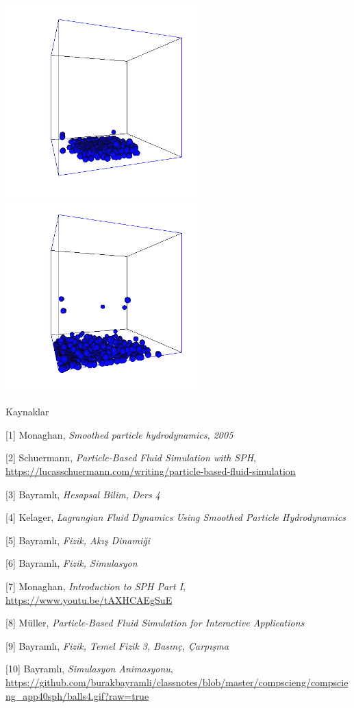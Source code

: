 \documentclass[12pt,fleqn]{article}\usepackage{../../common}
\begin{document}
\includegraphics[width=20em]{glutout-006.png}
\includegraphics[width=20em]{glutout-008.png}


Kaynaklar

[1] Monaghan, {\em Smoothed particle hydrodynamics, 2005}

[2] Schuermann, {\em Particle-Based Fluid Simulation with SPH},
    \url{https://lucasschuermann.com/writing/particle-based-fluid-simulation}

[3] Bayramlı, {\em Hesapsal Bilim, Ders 4}

[4] Kelager, {\em Lagrangian Fluid Dynamics Using Smoothed Particle Hydrodynamics}

[5] Bayramlı, {\em Fizik, Akış Dinamiği}

[6] Bayramlı, {\em Fizik, Simulasyon}

[7] Monaghan, {\em Introduction to SPH Part I},
    \url{https://www.youtu.be/tAXHCAEgSuE}

[8] Müller, {\em Particle-Based Fluid Simulation for Interactive Applications}

[9] Bayramlı, {\em Fizik, Temel Fizik 3, Basınç, Çarpışma}

[10] Bayramlı, {\em Simulasyon Animasyonu},
    \url{https://github.com/burakbayramli/classnotes/blob/master/compscieng/compscieng_app40sph/balls4.gif?raw=true}

    
\end{document}
